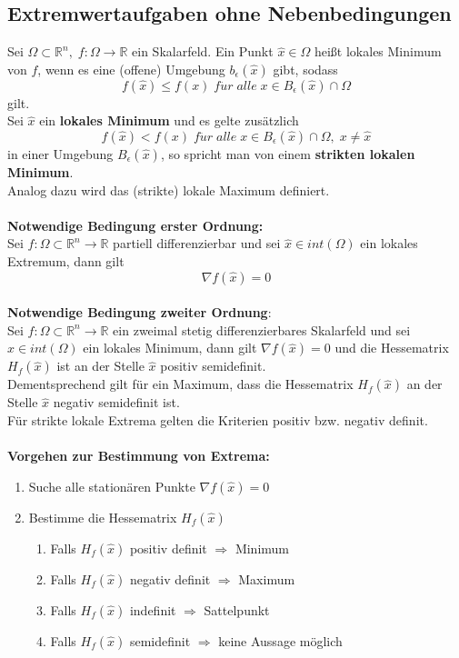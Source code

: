 \documentclass[a4paper,twocolumn,10pt]{article}
\begin{document}
\subsection{Extremwertaufgaben ohne Nebenbedingungen}
Sei $\Omega\subset\mathbb{R}^n,\;f:\Omega\rightarrow\mathbb{R}$ ein Skalarfeld. Ein Punkt $\hat{x}\in\Omega$ heißt lokales Minimum von $f$, wenn es eine (offene) Umgebung $b_{\epsilon}(\hat{x})$ gibt, sodass
\begin{equation*}
f(\hat{x})\leq f(x)\;f\ddot{u}r\;alle\;x\in B_{\epsilon}(\hat{x})\cap\Omega
\end{equation*}
gilt.\\
Sei $\hat{x}$ ein \textbf{lokales Minimum} und es gelte zusätzlich
\begin{equation*}
f(\hat{x})< f(x)\;f\ddot{u}r\;alle\;x\in B_{\epsilon}(\hat{x})\cap\Omega,\;x\neq \hat{x}
\end{equation*}
in einer Umgebung $B_{\epsilon}(\hat{x})$, so spricht man von einem \textbf{strikten lokalen Minimum}.\\
Analog dazu wird das (strikte) lokale Maximum definiert.\\\\
\textbf{Notwendige Bedingung erster Ordnung:}\\
Sei $f:\Omega\subset\mathbb{R}^n\rightarrow\mathbb{R}$ partiell differenzierbar und sei $\hat{x}\in int(\Omega)$ ein lokales Extremum, dann gilt
\begin{equation*}
\nabla f(\hat{x})=0
\end{equation*}\\
\textbf{Notwendige Bedingung zweiter Ordnung}:\\
Sei $f:\Omega\subset\mathbb{R}^n\rightarrow\mathbb{R}$ ein zweimal stetig differenzierbares Skalarfeld und sei $\hat{x}\in int(\Omega)$ ein lokales Minimum, dann gilt $\nabla f(\hat{x})=0$ und die Hessematrix $H_f(\hat{x})$ ist an der Stelle $\hat{x}$ positiv semidefinit.\\
Dementsprechend gilt für ein Maximum, dass die Hessematrix $H_f(\hat{x})$ an der Stelle $\hat{x}$ negativ semidefinit ist.\\
Für strikte lokale Extrema gelten die Kriterien positiv bzw. negativ definit.\\\\
\textbf{Vorgehen zur Bestimmung von Extrema:}\\
\begin{enumerate}
\item Suche alle stationären Punkte $\nabla f(\hat{x})=0$
\item Bestimme die Hessematrix $H_f(\hat{x})$
\begin{enumerate}[label=$\bullet$]
\item Falls $H_f(\hat{x})$ positiv definit $\Rightarrow$ Minimum
\item Falls $H_f(\hat{x})$ negativ definit $\Rightarrow$ Maximum
\item Falls $H_f(\hat{x})$ indefinit $\Rightarrow$ Sattelpunkt
\item Falls $H_f(\hat{x})$ semidefinit $\Rightarrow$ keine Aussage möglich
\end{enumerate}
\end{enumerate}
\end{document}

